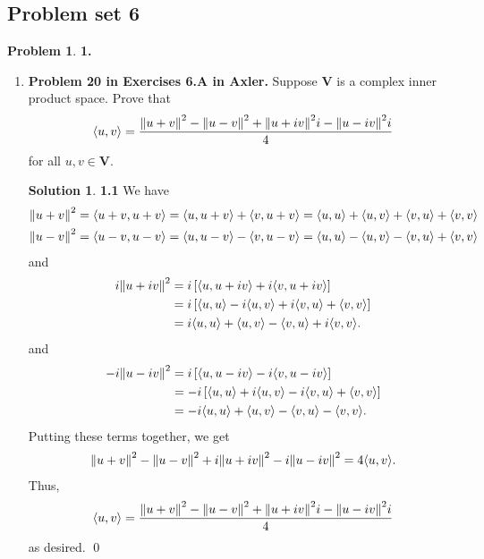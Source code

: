 \documentclass{article}
\theoremstyle{definition}
\newtheorem*{prob*}{Problem}
\newtheorem*{sln*}{Solution}
\newcommand{\V}{\mathbf{V}}
\newcommand{\la}{\langle}
\newcommand{\ra}{\rangle}
\begin{document}
\newpage


\subsection{Problem set 6}


\begin{prob*}\textbf{1.} \\
	\begin{enumerate}
		\item \textbf{Problem 20 in Exercises 6.A in Axler.} Suppose $\V$ is a complex inner product space. Prove that
		\begin{align*}
		\la u ,v \ra = \frac{\norm{u+ v}^2  - \norm{u-v}^2 + \norm{u + iv}^2i - \norm{u - iv}^2i   }{4} 
		\end{align*}
		for all $u,v \in \V$.
		
		\begin{sln*}\textbf{1.1} 
						We have
			\begin{align*}
			&\norm{u+v}^2 = \la u+v, u+v \ra = \la u,u+v \ra + \la v,u+v \ra = \la u,u\ra + \la u,v \ra + \la v,u \ra + \la v,v \ra\\
			&\norm{u-v}^2 = \la u-v, u-v \ra = \la u,u-v \ra - \la v,u-v \ra = \la u,u\ra - \la u,v \ra - \la v,u \ra + \la v,v \ra
			\end{align*}
			and
			\begin{align*}
			i\norm{u+iv}^2 &= i \left[ \la u,u+iv \ra + i\la v,u+iv\ra \right]\\
			&= i \left[ \la u,u \ra -i\la u,v \ra + i\la v,u\ra + \la v,v \ra \right]\\
			&= i\la u,u \ra + \la u,v \ra - \la v,u\ra + i\la v,v\ra.
			\end{align*}
			and
			\begin{align*}
			-i\norm{u-iv}^2 &= i \left[ \la u,u-iv \ra - i\la v,u-iv\ra \right]\\
			&= -i \left[ \la u,u \ra +i\la u,v \ra - i\la v,u\ra + \la v,v \ra \right]\\
			&= -i\la u,u \ra + \la u,v \ra - \la v,u\ra - \la v,v\ra.
			\end{align*}
			Putting these terms together, we get
			\begin{align*}
			\norm{u+v}^2  -\norm{u-v}^2 + i\norm{u+iv}^2 -i\norm{u-iv}^2 = 4\la u,v \ra.
			\end{align*}
			Thus, 
			\begin{align*}
			\la u ,v \ra = \frac{\norm{u+ v}^2  - \norm{u-v}^2 + \norm{u + iv}^2i - \norm{u - iv}^2i   }{4}
			\end{align*}
			as desired. \qed
		\end{sln*}
		

\end{enumerate}
\end{prob*}
\end{document}
